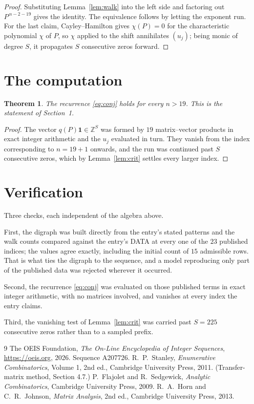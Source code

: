 \documentclass[11pt,a4paper]{article}
\theoremstyle{plain}
\newtheorem{theorem}{Theorem}
\theoremstyle{definition}
\begin{document}
\begin{proof}
Substituting Lemma~\ref{lem:walk} into the left side and factoring out
$P^{\,n-2-19}$ gives the identity. The equivalence follows by letting the exponent
run. For the last claim, Cayley--Hamilton gives $\chi(P)=0$ for the characteristic
polynomial $\chi$ of $P$, so $\chi$ applied to the shift annihilates $(u_j)$; being monic of
degree $S$, it propagates $S$ consecutive zeros forward.
\end{proof}

\section{The computation}

\begin{theorem}
The recurrence \eqref{eq:conj} holds for every $n>19$. This is the statement of
Section~1.
\end{theorem}

\begin{proof}
The vector $q(P)\mathbf{1}\in\mathbb{Z}^{S}$ was formed by $19$ matrix--vector
products in exact integer arithmetic and the $u_j$ evaluated in turn. They vanish from the
index corresponding to $n=19+1$ onwards, and the run was continued past $S$ consecutive
zeros, which by Lemma~\ref{lem:crit} settles every larger index.
\end{proof}

\section{Verification}

Three checks, each independent of the algebra above.

First, the digraph was built directly from the entry's stated patterns and the walk counts
compared against the entry's DATA at every one of the $23$ published indices; the
values agree exactly, including the initial count of $15$ admissible rows. That is
what ties the digraph to the sequence, and a model reproducing only part of the published
data was rejected wherever it occurred.

Second, the recurrence \eqref{eq:conj} was evaluated on those published terms in exact
integer arithmetic, with no matrices involved, and vanishes at every index the entry claims.

Third, the vanishing test of Lemma~\ref{lem:crit} was carried past $S=225$ consecutive
zeros rather than to a sampled prefix.

\begin{thebibliography}{9}
 The OEIS Foundation, \emph{The On-Line Encyclopedia of Integer
Sequences}, \url{https://oeis.org}, 2026. Sequence A207726.
 R.~P.~Stanley, \emph{Enumerative Combinatorics}, Volume 1, 2nd ed.,
Cambridge University Press, 2011. (Transfer-matrix method, Section 4.7.)
 P.~Flajolet and R.~Sedgewick, \emph{Analytic Combinatorics}, Cambridge
University Press, 2009.
 R.~A.~Horn and C.~R.~Johnson, \emph{Matrix Analysis}, 2nd ed., Cambridge
University Press, 2013.
\end{thebibliography}
\end{document}
